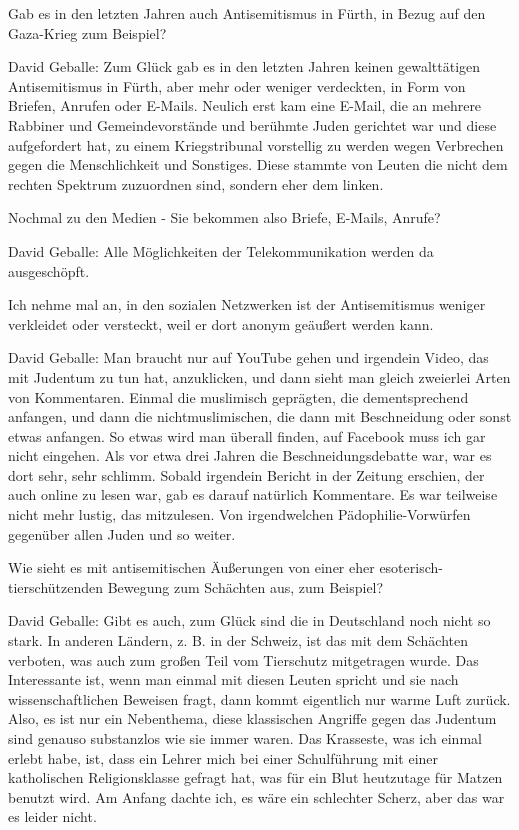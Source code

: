 Gab es in den letzten Jahren auch Antisemitismus in Fürth, in Bezug auf den Gaza-Krieg zum Beispiel? 

David Geballe: Zum Glück gab es in den letzten Jahren keinen gewalttätigen Antisemitismus in Fürth, aber mehr oder weniger verdeckten, in Form von Briefen, Anrufen oder E-Mails. Neulich erst kam eine E-Mail, die an mehrere Rabbiner und Gemeindevorstände und berühmte Juden gerichtet war und diese aufgefordert hat, zu einem Kriegstribunal vorstellig zu werden wegen Verbrechen gegen die Menschlichkeit und Sonstiges. Diese stammte von Leuten die nicht dem rechten Spektrum zuzuordnen sind, sondern eher dem linken. 

Nochmal zu den Medien - Sie bekommen also Briefe, E-Mails, Anrufe? 

David Geballe: Alle Möglichkeiten der Telekommunikation werden da ausgeschöpft. 

Ich nehme mal an, in den sozialen Netzwerken ist der Antisemitismus weniger verkleidet oder versteckt, weil er dort anonym geäußert werden kann. 

David Geballe: Man braucht nur auf YouTube gehen und irgendein Video, das mit Judentum zu tun hat, anzuklicken, und dann sieht man gleich zweierlei Arten von Kommentaren. Einmal die muslimisch geprägten, die dementsprechend anfangen, und dann die nichtmuslimischen, die dann mit Beschneidung oder sonst etwas anfangen. So etwas wird man überall finden, auf Facebook muss ich gar nicht eingehen. Als vor etwa drei Jahren die Beschneidungsdebatte war, war es dort sehr, sehr schlimm. Sobald irgendein Bericht in der Zeitung erschien, der auch online zu lesen war, gab es darauf natürlich Kommentare. Es war teilweise nicht mehr lustig, das mitzulesen. Von irgendwelchen Pädophilie-Vorwürfen gegenüber allen Juden und so weiter. 

Wie sieht es mit antisemitischen Äußerungen von einer eher esoterisch-tierschützenden Bewegung zum Schächten aus, zum Beispiel? 

David Geballe: Gibt es auch, zum Glück sind die in Deutschland noch nicht so stark. In anderen Ländern, z. B. in der Schweiz, ist das mit dem Schächten verboten, was auch zum großen Teil vom Tierschutz mitgetragen wurde. Das Interessante ist, wenn man einmal mit diesen Leuten spricht und sie nach wissenschaftlichen Beweisen fragt, dann kommt eigentlich nur warme Luft zurück. Also, es ist nur ein Nebenthema, diese klassischen Angriffe gegen das Judentum sind genauso substanzlos wie sie immer waren. Das Krasseste, was ich einmal erlebt habe, ist, dass ein Lehrer mich bei einer Schulführung mit einer katholischen Religionsklasse gefragt hat, was für ein Blut heutzutage für Matzen benutzt wird. Am Anfang dachte ich, es wäre ein schlechter Scherz, aber das war es leider nicht. 

